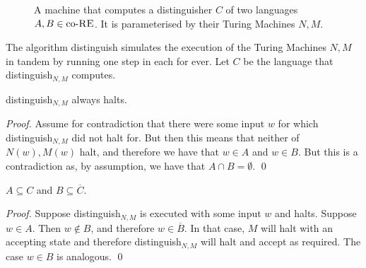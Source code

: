 \documentclass[11pt]{llncs}
\begin{document}
\begin{figure}[t]
\begin{algorithm}[H]
  \caption{\label{alg.9}
      A machine that computes a distinguisher $C$ of two languages $A, B \in
      \text{co-}\textsc{RE}$. It is parameterised by their Turing Machines $N,
      M$.
  }
  \begin{algorithmic}[1]
                  \State{}
              \EndIf
                  \State{}
              \EndIf
          \EndWhile
      \EndFunction
  \end{algorithmic}
\end{algorithm}
\end{figure}

The algorithm \textsf{distinguish} simulates the execution of the Turing
Machines $N, M$ in tandem by running one step in each for ever. Let $C$ be the
language that \textsf{distinguish}$_{N,M}$ computes.

\begin{lemma}
\textsf{distinguish}$_{N,M}$ always halts.
\end{lemma}
\begin{proof}
Assume for contradiction that there were some input $w$ for which
\textsf{distinguish}$_{N,M}$ did not halt for. But then this means that neither
of $N(w), M(w)$ halt, and therefore we have that $w \in A$ and $w \in B$. But
this is a contradiction as, by assumption, we have that $A \cap B = \emptyset$.
\qed
\end{proof}

\begin{lemma}
$A \subseteq C$ and $B \subseteq \overline C$.
\end{lemma}
\begin{proof}
Suppose \textsf{distinguish}$_{N,M}$ is executed with some input $w$ and
halts. Suppose $w \in A$. Then $w \not\in B$, and therefore $w \in \overline B$.
In that case, $M$ will halt with an accepting state and therefore
\textsf{distinguish}$_{N,M}$ will halt and accept as required. The case $w \in
B$ is analogous.
\qed
\end{proof}
\end{document}
